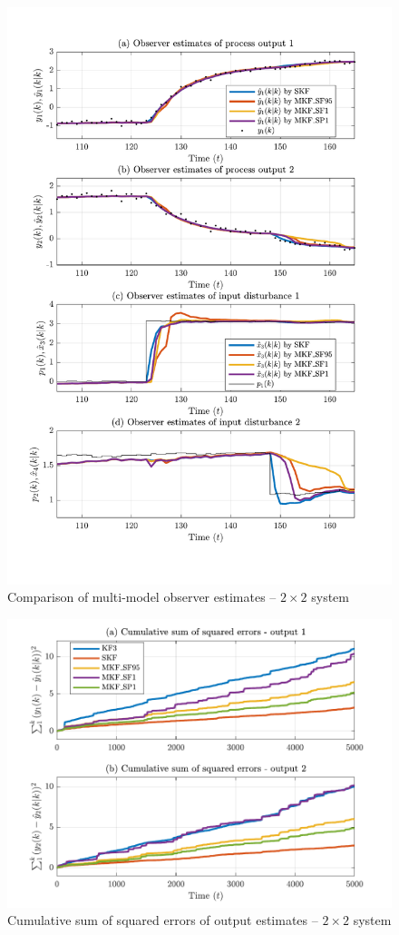 \begin{figure}[htp]
	\centering
	\includegraphics[width=13cm]{images/rod_obs_sim2_all_seed_y_est2_MKF.pdf}
	\caption{Comparison of multi-model observer estimates –  $2\times2$ system}
	\label{fig:rod-obs-sim2-yest-2-MKF}
\end{figure}

\begin{figure}[htp]
	\centering
	\includegraphics[width=13cm]{images/rod_obs_sim2_cum_err.pdf}
	\caption{Cumulative sum of squared errors of output estimates –  $2\times2$ system}
	\label{fig:sim-sys-sim2-MKF-cumerr}
\end{figure}

